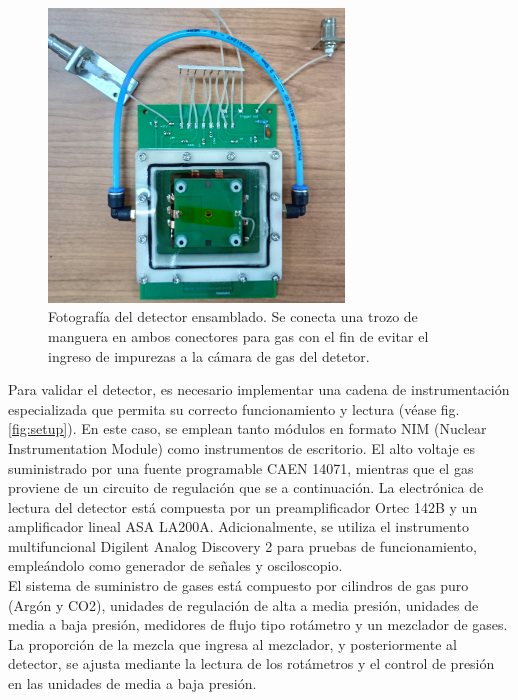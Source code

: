 \documentclass{article}
\begin{document}
\begin{figure}[H]
    \centering
    \includegraphics[width=0.7\textwidth]{ensamblado.jpg}
    \caption{Fotografía del detector ensamblado. Se conecta una trozo de manguera en ambos conectores para gas con el fin de evitar el ingreso de impurezas a la cámara de gas del detetor.}
    \label{fig:ensamblado}
\end{figure}

\noindent Para validar el detector, es necesario implementar una cadena de instrumentación especializada que permita su correcto funcionamiento y lectura (véase fig. \ref{fig:setup}). En este caso, se emplean tanto módulos en formato NIM (Nuclear Instrumentation Module) como instrumentos de escritorio. El alto voltaje es suministrado por una fuente programable CAEN 14071, mientras que el gas proviene de un circuito de regulación que se a continuación. La electrónica de lectura del detector está compuesta por un preamplificador Ortec 142B y un amplificador lineal ASA LA200A. Adicionalmente, se utiliza el instrumento multifuncional Digilent Analog Discovery 2 para pruebas de funcionamiento, empleándolo como generador de señales y osciloscopio.\\

\noindent El sistema de suministro de gases está compuesto por cilindros de gas puro (Argón y CO2), unidades de regulación de alta a media presión, unidades de media a baja presión, medidores de flujo tipo rotámetro y un mezclador de gases. La proporción de la mezcla que ingresa al mezclador, y posteriormente al detector, se ajusta mediante la lectura de los rotámetros y el control de presión en las unidades de media a baja presión.
\end{document}
